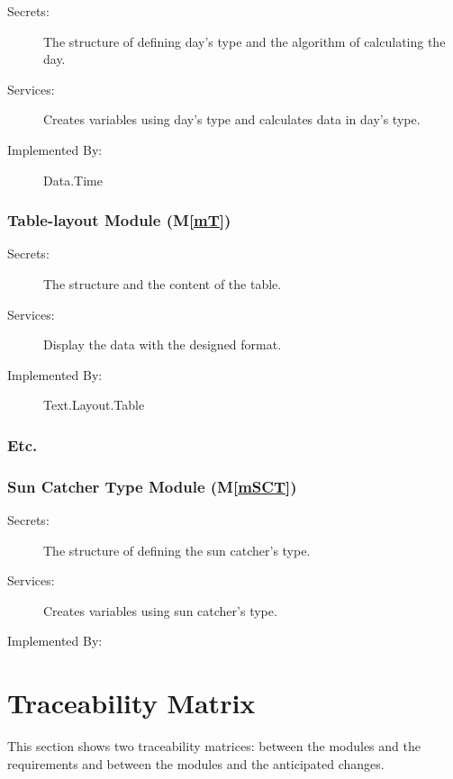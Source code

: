 \documentclass[12pt, titlepage]{article}
\newcommand{\mref}[1]{M\ref{#1}}
\begin{document}
\begin{description}
\item[Secrets:] The structure of defining day's type and the algorithm of calculating the day.
\item[Services:] Creates variables using day's type and calculates data in day's type.
\item[Implemented By:] Data.Time
\end{description}

\subsubsection{Table-layout Module (\mref{mT})}

\begin{description}
\item[Secrets:] The structure and the content   of the table.
\item[Services:] Display the data with the designed format. 
\item[Implemented By:] Text.Layout.Table
\end{description}
\subsubsection{Etc.}

\subsubsection{Sun Catcher Type Module (\mref{mSCT})}

\begin{description}
\item[Secrets:] The structure of defining the sun catcher's type.
\item[Services:] Creates variables using sun catcher's type.
\item[Implemented By:] \progname
\end{description}



\section{Traceability Matrix} \label{SecTM}

This section shows two traceability matrices: between the modules and the
requirements and between the modules and the anticipated changes.
\end{document}
